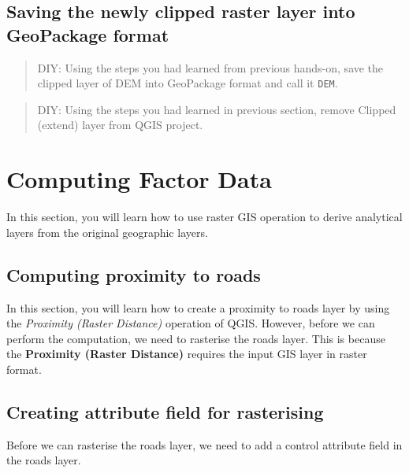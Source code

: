 \documentclass[
  letterpaper,
  DIV=11,
  numbers=noendperiod]{scrreprt}
\begin{document}
\hypertarget{saving-the-newly-clipped-raster-layer-into-geopackage-format}{%
\subsection{Saving the newly clipped raster layer into GeoPackage
format}\label{saving-the-newly-clipped-raster-layer-into-geopackage-format}}

\begin{quote}
DIY: Using the steps you had learned from previous hands-on, save the
clipped layer of DEM into GeoPackage format and call it \texttt{DEM}.
\end{quote}

\begin{quote}
DIY: Using the steps you had learned in previous section, remove Clipped
(extend) layer from QGIS project.
\end{quote}

\hypertarget{computing-factor-data}{%
\section{Computing Factor Data}\label{computing-factor-data}}

In this section, you will learn how to use raster GIS operation to
derive analytical layers from the original geographic layers.

\hypertarget{computing-proximity-to-roads}{%
\subsection{Computing proximity to
roads}\label{computing-proximity-to-roads}}

In this section, you will learn how to create a proximity to roads layer
by using the \emph{Proximity (Raster Distance)} operation of QGIS.
However, before we can perform the computation, we need to rasterise the
roads layer. This is because the \textbf{Proximity (Raster Distance)}
requires the input GIS layer in raster format.

\hypertarget{creating-attribute-field-for-rasterising}{%
\subsection{Creating attribute field for
rasterising}\label{creating-attribute-field-for-rasterising}}

Before we can rasterise the roads layer, we need to add a control
attribute field in the roads layer.
\end{document}
